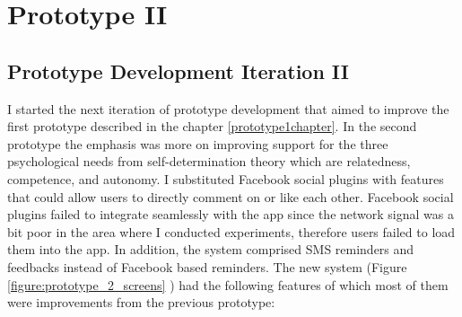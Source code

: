 
\chapter{Prototype II} %

\label{prototytpe2chapter} %


\section{Prototype Development Iteration II}
I started the next iteration of prototype development that aimed to improve the first prototype described in the chapter \ref{prototype1chapter}. In the second prototype the emphasis was more on improving support for the three psychological needs from self-determination theory \citep{ryan2000:self} which are relatedness, competence, and autonomy. I substituted Facebook social plugins with features that could allow users to directly comment on or like each other. Facebook social plugins failed to integrate seamlessly with the app since the network signal was a bit poor in the area where I conducted experiments, therefore users failed to load them into the app. In addition, the system comprised SMS reminders and feedbacks instead of Facebook based reminders. The new system (Figure \ref{figure:prototype_2_screens} ) had the following features of which most of them were improvements from the previous prototype:

